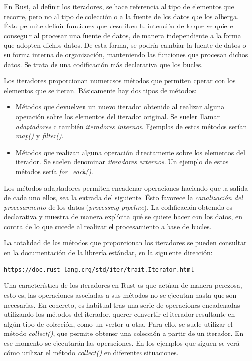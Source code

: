 En Rust, al definir los iteradores, se hace referencia al tipo de elementos que recorre, pero no al tipo de colección o a la fuente de los datos que los alberga. Ésto permite definir funciones que describen la intención de lo que se quiere conseguir al procesar una fuente de datos, de manera independiente a la forma que adopten dichos datos. De esta forma, se podría cambiar la fuente de datos o su forma interna de organización, manteniendo las funciones que procesan dichos datos. Se trata de una codificación más declarativa que los bucles.

Los iteradores proporcionan numerosos métodos que permiten operar con los elementos que se iteran. Básicamente hay dos tipos de métodos:

\begin{itemize}
   \item Métodos que devuelven un nuevo iterador obtenido al realizar alguna operación sobre los elementos del iterador original. Se suelen llamar \textit{adaptadores} o también \textit{iteradores internos}. Ejemplos de estos métodos serían \textit{map()} y \textit{filter()}.
   \item Métodos que realizan alguna operación directamente sobre los elementos del iterador. Se suelen denominar \textit{iteradores externos}. Un ejemplo de estos métodos sería \textit{for\_each()}. 
\end{itemize}

Los métodos adaptadores permiten encadenar operaciones haciendo que la salida de cada uno ellos, sea la entrada del siguiente. Ésto favorece la \textit{canalización del procesamiento} de los datos (\textit{processing pipeline}). La codificación obtenida es declarativa y muestra de manera explícita qué se quiere hacer con los datos, en contra de lo que sucede al realizar el procesamiento a base de bucles.

La totalidad de los métodos que proporcionan los iteradores se pueden consultar en la documentación de la librería estándar, en la siguiente dirección:

{\centering\small \texttt{https://doc.rust-lang.org/std/iter/trait.Iterator.html} \par}

Una característica de los iteradores en Rust es que actúan de manera perezosa, esto es, las operaciones asociadas a sus métodos no se ejecutan hasta que son necesarias. En concreto, es habitual tras una serie de operaciones encadenadas utilizando los métodos del iterador, querer convertir el iterador resultante en algún tipo de colección, como un vector u otra. Para ello, se suele utilizar el método \textit{collect()}, que permite obtener una colección a partir de un iterador. En ese momento se ejecutarán las operaciones. En los ejemplos que siguen se verá cómo utilizar el método \textit{collect()} en diferentes situaciones.

